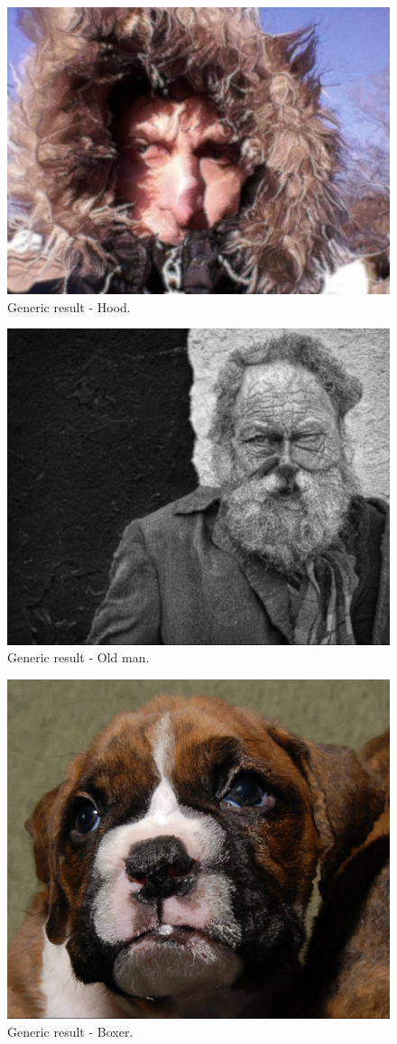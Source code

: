 \begin{figure} \centering
\includegraphics[width=5.1in]{images/generic-hood.jpg}
\caption{Generic result - Hood.}    
\end{figure}
\begin{figure}\centering
\includegraphics[width=4.5in]{images/generic-oldman.jpg}
\caption{Generic result - Old man.}    
\end{figure}
\begin{figure}\centering
\includegraphics[width=4.5in]{images/generic-boxer.jpg}
\caption{Generic result - Boxer.}    
\end{figure}
